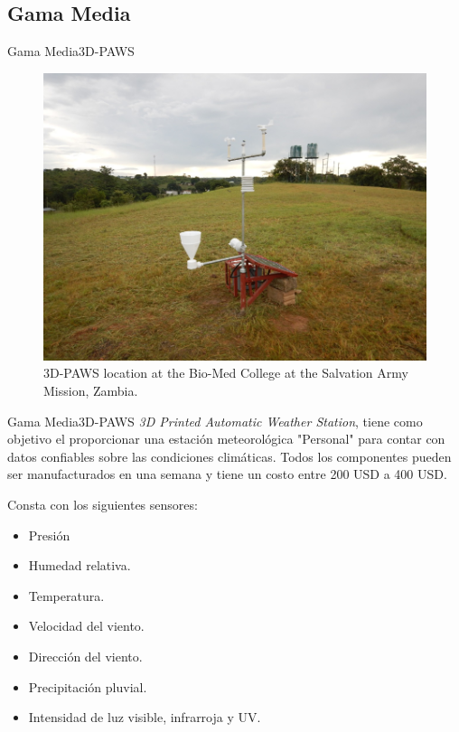 \documentclass[]{beamer}
\begin{document}
\subsection{Gama Media}
\begin{frame}{Gama Media}{3D-PAWS}
  \begin{figure}
    \includegraphics[height=0.7\textheight]{Docs/3dpaws1}
    \caption{3D-PAWS location at the Bio-Med College at the Salvation Army Mission, Zambia.}
  \end{figure}
\end{frame}

\begin{frame}{Gama Media}{3D-PAWS}
\emph{3D Printed Automatic Weather Station}, tiene como objetivo el proporcionar una estación meteorológica "Personal" para contar con datos confiables sobre las condiciones climáticas. Todos los componentes pueden ser manufacturados en una semana y tiene un costo entre 200 USD a 400 USD.

Consta con los siguientes sensores:
\begin{itemize}
  \item Presión
  \item Humedad relativa.
  \item Temperatura.
  \item Velocidad del viento.
  \item Dirección del viento.
  \item Precipitación pluvial.
  \item Intensidad de luz visible, infrarroja y UV.
\end{itemize}

\end{frame}
\end{document}
